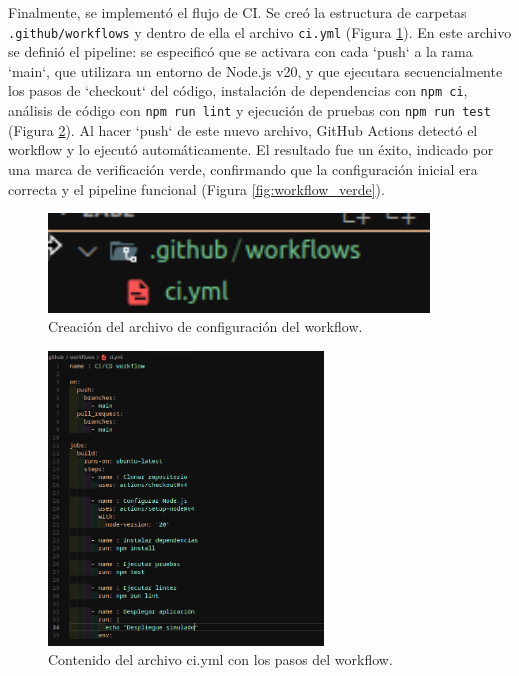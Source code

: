 \documentclass[12pt, a4paper]{article}
\begin{document}
Finalmente, se implement\'o el flujo de CI. Se cre\'o la estructura de carpetas \texttt{.github/workflows} y dentro de ella el archivo \texttt{ci.yml} (Figura \ref{fig:crear_ci_yml}). En este archivo se defini\'o el pipeline: se especific\'o que se activara con cada `push` a la rama `main`, que utilizara un entorno de Node.js v20, y que ejecutara secuencialmente los pasos de `checkout` del c\'odigo, instalaci\'on de dependencias con \texttt{npm ci}, an\'alisis de c\'odigo con \texttt{npm run lint} y ejecuci\'on de pruebas con \texttt{npm run test} (Figura \ref{fig:config_ci_yml}). Al hacer `push` de este nuevo archivo, GitHub Actions detect\'o el workflow y lo ejecut\'o autom\'aticamente. El resultado fue un \'exito, indicado por una marca de verificaci\'on verde, confirmando que la configuraci\'on inicial era correcta y el pipeline funcional (Figura \ref{fig:workflow_verde}).

\begin{figure}[H]
    \centering
    \includegraphics[width=0.9\textwidth]{img/creamos ciyml dnetro de github y workflows.png}
    \caption{Creaci\'on del archivo de configuraci\'on del workflow.}
    \label{fig:crear_ci_yml}
\end{figure}

\begin{figure}[H]
    \centering
    \includegraphics[width=0.65\textwidth]{img/configuracion inicial de ciyml en la cual se maneja todo lo necesrio para el despliegue.png}
    \caption{Contenido del archivo ci.yml con los pasos del workflow.}
    \label{fig:config_ci_yml}
\end{figure}
\end{document}
